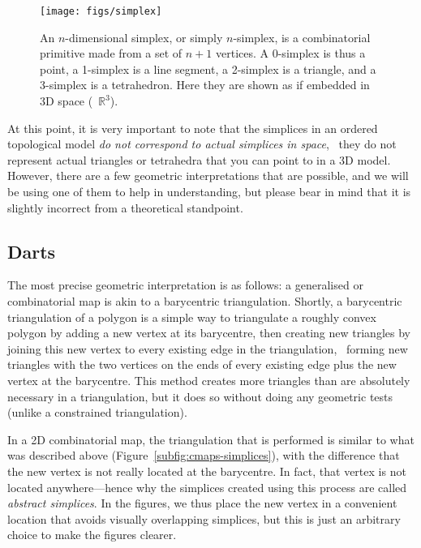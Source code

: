 \begin{figure}
\centering
\texttt{[image: figs/simplex]}
\caption{An \(n\)-dimensional simplex, or simply \(n\)-simplex, is a combinatorial primitive made from a set of \(n+1\) vertices.
A 0-simplex is thus a point, a 1-simplex is a line segment, a 2-simplex is a triangle, and a 3-simplex is a tetrahedron.
Here they are shown as if embedded in 3D space (\ie\ \(\mathbb{R}^3\)).}%
\label{fig:simplices}
\end{figure}

At this point, it is very important to note that the simplices in an ordered topological model \emph{do not correspond to actual simplices in space}, \ie\ they do not represent actual triangles or tetrahedra that you can point to in a 3D model.
However, there are a few geometric interpretations that are possible, and we will be using one of them to help in understanding, but please bear in mind that it is slightly incorrect from a theoretical standpoint.

\subsection{Darts}

The most precise geometric interpretation is as follows: a generalised or combinatorial map is akin to a barycentric triangulation.
Shortly, a barycentric triangulation of a polygon is a simple way to triangulate a roughly convex polygon by adding a new vertex at its barycentre, then creating new triangles by joining this new vertex to every existing edge in the triangulation, \ie\ forming new triangles with the two vertices on the ends of every existing edge plus the new vertex at the barycentre.
This method creates more triangles than are absolutely necessary in a triangulation, but it does so without doing any geometric tests (unlike a constrained triangulation).

In a 2D combinatorial map, the triangulation that is performed is similar to what was described above (Figure~\ref{subfig:cmaps-simplices}), with the difference that the new vertex is not really located at the barycentre.
In fact, that vertex is not located anywhere---hence why the simplices created using this process are called \emph{abstract simplices}.
In the figures, we thus place the new vertex in a convenient location that avoids visually overlapping simplices, but this is just an arbitrary choice to make the figures clearer.

